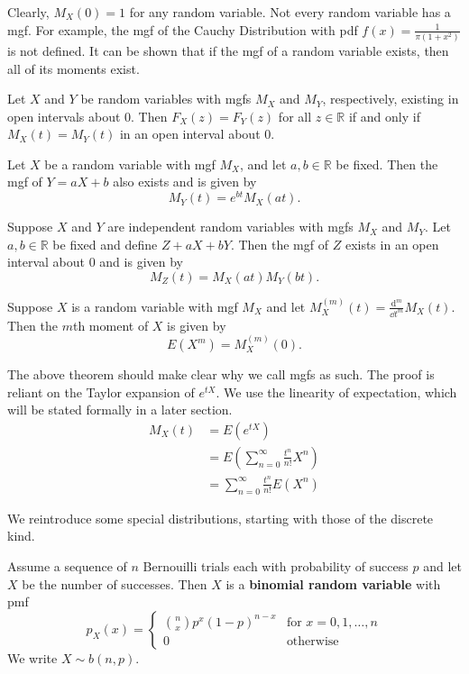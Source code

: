 Clearly, $M_X(0)=1$ for any random variable. Not every random variable has a mgf. For example, the mgf of the Cauchy Distribution with pdf $f(x)=\frac{1}{\pi(1+x^2)}$ is not defined. It can be shown that if the mgf of a random variable exists, then all of its moments exist.

\begin{theorem}[]
	Let $X$ and $Y$ be random variables with mgfs $M_X$ and $M_Y$, respectively, existing in open intervals about 0. Then $F_X(z)=F_Y(z)$ for all $z\in\mathbb R$ if and only if $M_X(t)=M_Y(t)$ in an open interval about 0.
\end{theorem}

\begin{theorem}[]
	Let $X$ be a random variable with mgf $M_X$, and let $a,b\in\mathbb R$ be fixed. Then the mgf of $Y=aX+b$ also exists and is given by $$M_Y(t)=e^{bt}M_X(at).$$
\end{theorem}

\begin{theorem}[]
	Suppose $X$ and $Y$ are independent random variables with mgfs $M_X$ and $M_Y$. Let $a,b\in\mathbb R$ be fixed and define $Z+aX+bY$. Then the mgf of $Z$ exists in an open interval about 0 and is given by
	$$M_Z(t)=M_X(at)M_Y(bt).$$
\end{theorem}

\begin{theorem}[]
	Suppose $X$ is a random variable with mgf $M_X$ and let $M_X^{(m)}(t)=\frac{\mathrm{d}^m}{\dd t^m}M_X(t)$. Then the $m$th moment of $X$ is given by $$E(X^m)=M_X^{(m)}(0).$$
\end{theorem}

The above theorem should make clear why we call mgfs as such. The proof is reliant on the Taylor expansion of $e^{tX}$. We use the linearity of expectation, which will be stated formally in a later section.
\begin{align*}
	M_X(t)&=E(e^{tX})\\
	&=E\left(\sum_{n=0}^\infty \frac{t^n}{n!}X^n\right)\\
	&=\sum_{n=0}^\infty \frac{t^n}{n!}E(X^n)
\end{align*}

We reintroduce some special distributions, starting with those of the discrete kind.

\begin{definition}
	Assume a sequence of $n$ Bernouilli trials each with probability of success $p$ and let $X$ be the number of successes. Then $X$ is a \textbf{binomial random variable} with pmf $$p_X(x)=\begin{cases}
		\binom{n}{x}p^x(1-p)^{n-x} & \text{for $x=0,1,\hdots,n$}\\
		0 & \text{otherwise}
	\end{cases}$$
	We write $X\sim b(n,p)$.
\end{definition}

